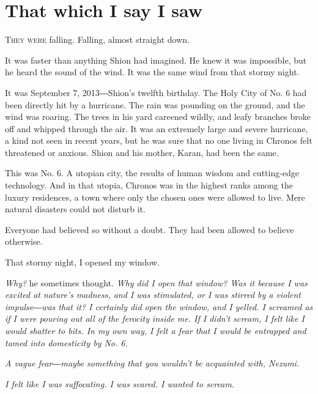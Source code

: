 
\chapter{That which I say I saw}


\lettrine{T}{hey were} falling. Falling, almost straight down.

It was faster than anything Shion had imagined. He knew it was
impossible, but he heard the sound of the wind. It was the same wind
from that stormy night.

It was September 7, 2013―Shion's twelfth birthday. The Holy City of No.
6 had been directly hit by a hurricane. The rain was pounding on the
ground, and the wind was roaring. The trees in his yard careened wildly,
and leafy branches broke off and whipped through the air. It was an
extremely large and severe hurricane, a kind not seen in recent years,
but he was sure that no one living in Chronos felt threatened or
anxious. Shion and his mother, Karan, had been the same.

This was No. 6. A utopian city, the results of human wisdom and
cutting-edge technology. And in that utopia, Chronos was in the highest
ranks among the luxury residences, a town where only the chosen ones
were allowed to live. Mere natural disasters could not disturb it.

Everyone had believed so without a doubt. They had been allowed to
believe otherwise.

That stormy night, I opened my window.

\emph{Why?} he sometimes thought. \emph{Why did I open that window? Was it because I
was excited at nature's madness, and I was stimulated, or I was stirred
by a violent impulse―was that it? I certainly did open the window, and I
yelled. I screamed as if I were pouring out all of the ferocity inside
me. If I didn't scream, I felt like I would shatter to bits. In my own
way, I felt a fear that I would be entrapped and tamed into domesticity
by No. 6.}

\emph{A vague fear―maybe something that you wouldn't be acquainted with,
Nezumi.}

\emph{I felt like I was suffocating. I was scared. I wanted to scream.}

